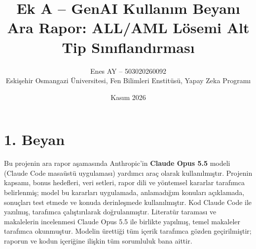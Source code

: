 \documentclass[11pt,a4paper]{article}
\title{Ek A -- GenAI Kullanım Beyanı\\[2pt]\large Ara Rapor: ALL/AML Lösemi Alt Tip Sınıflandırması}
\author{Enes AY -- 503020260092\\\small Eskişehir Osmangazi Üniversitesi, Fen Bilimleri Enstitüsü, Yapay Zeka Programı}
\date{Kasım 2026}
\begin{document}
\maketitle

\section*{1. Beyan}
Bu projenin ara rapor aşamasında Anthropic'in \textbf{Claude Opus 5.5} modeli (Claude Code masaüstü
uygulaması) yardımcı araç olarak kullanılmıştır. Projenin kapsamı, bonus hedefleri, veri setleri,
rapor dili ve yöntemsel kararlar tarafımca belirlenmiş; model bu kararları uygulamada, anlamadığım
konuları açıklamada, sonuçları test etmede ve konuda derinleşmede kullanılmıştır. Kod Claude Code ile
yazılmış, tarafımca çalıştırılarak doğrulanmıştır. Literatür taraması ve makalelerin incelenmesi
Claude Opus 5.5 ile birlikte yapılmış, temel makaleler tarafımca okunmuştur. Modelin ürettiği tüm
içerik tarafımca gözden geçirilmiştir; raporun ve kodun içeriğine ilişkin tüm sorumluluk bana aittir.
\end{document}
